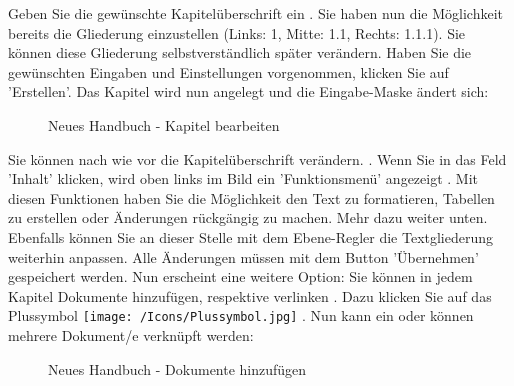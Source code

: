 Geben Sie die gewünschte Kapitelüberschrift ein . Sie haben nun die Möglichkeit bereits die Gliederung einzustellen (Links: 1, Mitte: 1.1, Rechts: 1.1.1). Sie können diese Gliederung selbstverständlich später verändern. Haben Sie die gewünschten Eingaben und Einstellungen vorgenommen, klicken Sie auf 'Erstellen'. Das Kapitel wird nun angelegt und die Eingabe-Maske ändert sich:

\begin{figure}[H]
\caption{Neues Handbuch - Kapitel bearbeiten}
\end{figure}

Sie können nach wie vor die Kapitelüberschrift verändern. . Wenn Sie in das Feld 'Inhalt'  klicken, wird oben links im Bild ein 'Funktionsmenü' angezeigt . Mit diesen Funktionen haben Sie die Möglichkeit den Text zu formatieren, Tabellen zu erstellen oder Änderungen rückgängig zu machen. Mehr dazu weiter unten. Ebenfalls können Sie an dieser Stelle mit dem Ebene-Regler  die Textgliederung weiterhin anpassen. Alle Änderungen müssen mit dem Button 'Übernehmen'  gespeichert werden. Nun erscheint eine weitere Option: Sie können in jedem Kapitel Dokumente hinzufügen, respektive verlinken . Dazu klicken Sie auf das Plussymbol \texttt{[image: /Icons/Plussymbol.jpg]} . Nun kann ein oder können mehrere Dokument/e verknüpft werden:

\begin{figure}[H]
\caption{Neues Handbuch - Dokumente hinzufügen}
\end{figure}

